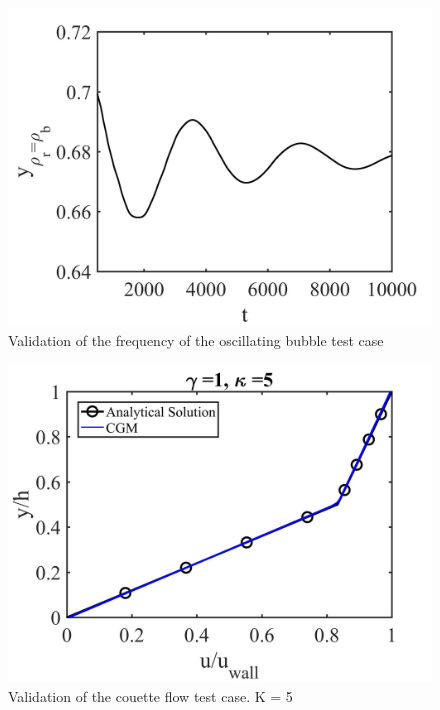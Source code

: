 \documentclass[12pt, openany]{book}
\begin{document}
    \begin{figure}[H]
       	\centering
       	\includegraphics[width=0.8\linewidth]{Resources/Images/AntonioValid/YOscillation.jpg}
       	\caption{Validation of the frequency of the oscillating bubble test case}
       	\label{fig:oscilfreqvalid}
    \end{figure}
    
    \begin{figure}[H]
          	\centering
          	\includegraphics[width=0.8\linewidth]{Resources/Images/AntonioValid/E_G1_K5.jpg}
          	\caption{Validation of the couette flow test case. K = 5}
          	\label{fig:couett}
    \end{figure}
    
\end{document}
